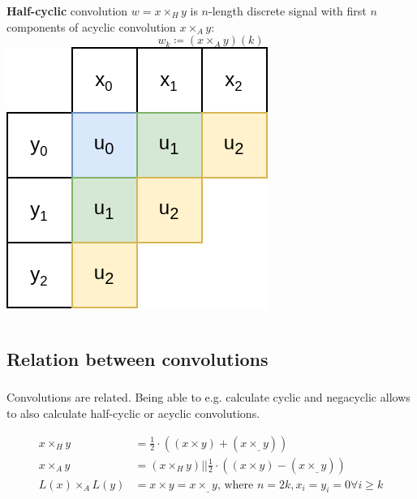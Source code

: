 \documentclass{beamer}
\begin{document}
\begin{frame}
		\frametitle{\secname}
		\framesubtitle{\subsecname}

 		\begin{columns}
				\textbf{Half-cyclic} convolution $w = x \times_H y$ is $n$-length discrete
				signal with first $n$ components of acyclic convolution $x \times_A y$:
				\[
						w_k \coloneqq (x \times_A y)(k)
				\]
 				\includegraphics[width=\textwidth]{../resources/halfcyclic_convolution.drawio.png}
		\end{columns}
\end{frame}

\subsection{Relation between convolutions}

\begin{frame}
		\frametitle{\secname}
		\framesubtitle{\subsecname}

		Convolutions are related. Being able to e.g. calculate cyclic and
		negacyclic allows to also calculate half-cyclic or acyclic
		convolutions.

		\begin{align*}
				x \times_H y & = \frac{1}{2} \cdot ((x \times y) + (x \times_{\_} y)) \\
				x \times_A y & = (x \times_H y) || \frac{1}{2} \cdot ((x \times y) - (x \times_{\_} y)) \\
				L(x) \times_A L(y) & = x \times y = x \times_{\_} y\text{, where } n = 2k, x_i = y_i = 0 \forall i \geq k
		\end{align*}
\end{frame}
\end{document}

